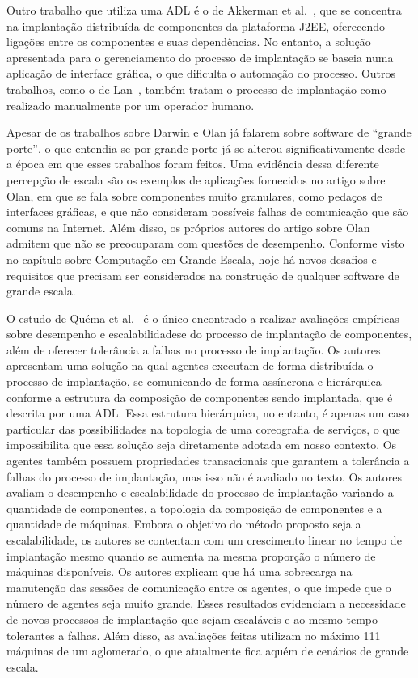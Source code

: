 Outro trabalho que utiliza uma ADL é o de Akkerman et al.~\cite{akkerman2005j2ee}, que se concentra na implantação distribuída de componentes da plataforma J2EE, oferecendo ligações entre os componentes e suas dependências. No entanto, a solução apresentada para o gerenciamento do processo de implantação se baseia numa aplicação de interface gráfica, o que dificulta o automação do processo. Outros trabalhos, como o de Lan~\cite{lan2005architecture}, também tratam o processo de implantação como realizado manualmente por um operador humano.

Apesar de os trabalhos sobre Darwin e Olan já falarem sobre software de ``grande porte'', o que entendia-se por grande porte já se alterou significativamente desde a época em que esses trabalhos foram feitos. Uma evidência dessa diferente percepção de escala são os exemplos de aplicações fornecidos no artigo sobre Olan, em que se fala sobre componentes muito granulares, como pedaços de interfaces gráficas, e que não consideram possíveis falhas de comunicação que são comuns na Internet. Além disso, os próprios autores do artigo sobre Olan admitem que não se preocuparam com questões de desempenho. Conforme visto no capítulo sobre Computação em Grande Escala, hoje há novos desafios e requisitos que precisam ser considerados na construção de qualquer software de grande escala.

O estudo de Quéma et al.~\cite{quema2004hierarchical} é o único encontrado a realizar avaliações empíricas sobre desempenho e escalabilidadese do processo de implantação de componentes, além de oferecer tolerância a falhas no processo de implantação.
Os autores apresentam uma solução na qual agentes executam de forma distribuída o processo de implantação, se comunicando de forma assíncrona e hierárquica conforme a estrutura da composição de componentes sendo implantada, que é descrita por uma ADL. 
Essa estrutura hierárquica, no entanto, é apenas um caso particular das possibilidades na topologia de uma coreografia de serviços, o que impossibilita que essa solução seja diretamente adotada em nosso contexto.
Os agentes também possuem propriedades transacionais que garantem a tolerância a falhas do processo de implantação, mas isso não é avaliado no texto. 
Os autores avaliam o desempenho e escalabilidade do processo de implantação variando a quantidade de componentes, a topologia da composição de componentes e a quantidade de máquinas.
Embora o objetivo do método proposto seja a escalabilidade, os autores se contentam com um crescimento linear no tempo de implantação mesmo quando se aumenta na mesma proporção o número de máquinas disponíveis.
Os autores explicam que há uma sobrecarga na manutenção das sessões de comunicação entre os agentes, o que impede que o número de agentes seja muito grande. 
Esses resultados evidenciam a necessidade de novos processos de implantação que sejam escaláveis e ao mesmo tempo tolerantes a falhas.
Além disso, as avaliações feitas utilizam no máximo 111 máquinas de um aglomerado, o que atualmente fica aquém de cenários de grande escala. 


